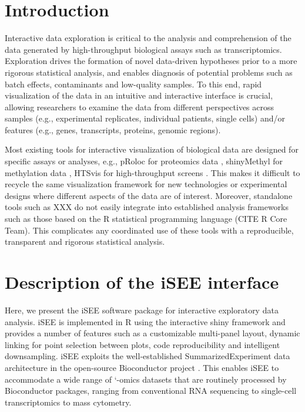\documentclass{bioinfo}
\begin{document}
\section{Introduction}
Interactive data exploration is critical to the analysis and comprehension of the data generated by high-throughput biological assays such as transcriptomics. 
Exploration drives the formation of novel data-driven hypotheses prior to a more rigorous statistical analysis, and enables diagnosis of potential problems such as batch effects, contaminants and low-quality samples. 
To this end, rapid visualization of the data in an intuitive and interactive interface is crucial, allowing researchers to examine the data from different perspectives across samples (e.g., experimental replicates, individual patients, single cells) and/or features (e.g., genes, transcripts, proteins, genomic regions).

Most existing tools for interactive visualization of biological data are designed for specific assays or analyses, e.g., pRoloc for proteomics data \citep{gatto2014mass}, shinyMethyl for methylation data \citep{fortin2014shinymethyl}, HTSvis for high-throughput screens \citep{scheeder2017htsvis}.
This makes it difficult to recycle the same visualization framework for new technologies or experimental designs where different aspects of the data are of interest. 
Moreover, standalone tools such as XXX do not easily integrate into established analysis frameworks such as those based on the R statistical programming language (CITE R Core Team). 
This complicates any coordinated use of these tools with a reproducible, transparent and rigorous statistical analysis. 

\section{Description of the iSEE interface}
Here, we present the iSEE software package for interactive exploratory data analysis. 
iSEE is implemented in R using the interactive shiny framework and provides a number of features such as a customizable multi-panel layout, dynamic linking for point selection between plots, code reproducibility and intelligent downsampling. 
iSEE exploits the well-established SummarizedExperiment data architecture in the open-source Bioconductor project \citep{gentleman2004bioconductor}.
This enables iSEE to accommodate a wide range of `-omics datasets that are routinely processed by Bioconductor packages, ranging from conventional RNA sequencing to single-cell transcriptomics to mass cytometry.
\end{document}
